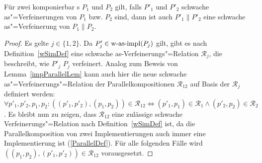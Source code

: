 \begin{Lem}
  \label{schwVerfParallelLem}
  Für zwei komponierbar \MEIO{}s $P_1$ und $P_2$ gilt, falls $P'_1$ und $P'_2$
  schwache as"=Verfeinerungen von $P_1$ bzw. $P_2$ sind, dann ist auch
  $P'_1\|P'_2$ eine schwache as"=Verfeinerung von $P_1\|P_2$.
\end{Lem}
\begin{proof}


  Es gelte $j\in\{1,2\}$. Da $P'_j\in\mathrm{w}\text{-}\mathrm{as}\text{-}\mathrm{impl} (P_j)$ gilt, gibt es nach
  Definition~\ref{wSimDef} eine schwache as-Verfeinerungs"=Relation
  $\mathcal{R}_j$, die beschreibt, wie $P'_j$ $P_j$ verfeinert. Analog zum
  Beweis von Lemma~\ref{impParallelLem} kann auch hier die neue schwache
  as"=Verfeinerungs"=Relation der Parallelkompositionen $\mathcal{R}_{12}$
  auf Basis der $\mathcal{R}_j$ definiert werden: $\forall p'_1,p'_2,p_1,p_2:
  ((p'_1,p'_2),(p_1,p_2))\in\mathcal{R}_{12} \Leftrightarrow
  (p'_1,p_1)\in\mathcal{R}_1 \land (p'_2,p_2)\in\mathcal{R}_2$. Es bleibt nun
  zu zeigen, dass $\mathcal{R}_{12}$ eine zulässige schwache
  Verfeinerungs"=Relation nach Definition~\ref{wSimDef} ist, da die
  Parallelkomposition von zwei Implementierungen auch immer eine
  Implementierung ist (\ref{ParallelDef}). Für alle folgenden Fälle wird
  $((p_1,p_2),(p'_1,p'_2))\in\mathcal{R}_{12}$ vorausgesetzt.
\end{proof}

